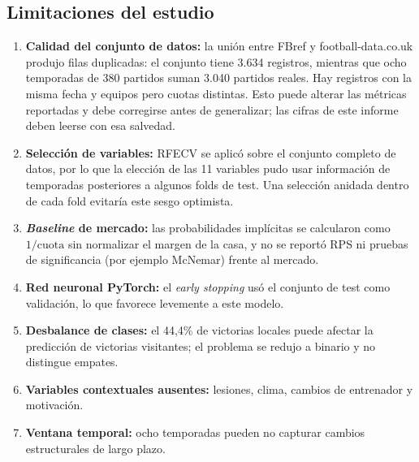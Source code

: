 \documentclass{ieeeaccess}
\begin{document}
\subsection{Limitaciones del estudio}
\begin{enumerate}
\item \textbf{Calidad del conjunto de datos:} la unión entre FBref y football-data.co.uk produjo filas duplicadas: el conjunto tiene 3.634 registros, mientras que ocho temporadas de 380 partidos suman 3.040 partidos reales. Hay registros con la misma fecha y equipos pero cuotas distintas. Esto puede alterar las métricas reportadas y debe corregirse antes de generalizar; las cifras de este informe deben leerse con esa salvedad.
\item \textbf{Selección de variables:} RFECV se aplicó sobre el conjunto completo de datos, por lo que la elección de las 11 variables pudo usar información de temporadas posteriores a algunos folds de test. Una selección anidada dentro de cada fold evitaría este sesgo optimista.
\item \textbf{\textit{Baseline} de mercado:} las probabilidades implícitas se calcularon como $1/\text{cuota}$ sin normalizar el margen de la casa, y no se reportó RPS ni pruebas de significancia (por ejemplo McNemar) frente al mercado.
\item \textbf{Red neuronal PyTorch:} el \textit{early stopping} usó el conjunto de test como validación, lo que favorece levemente a este modelo.
\item \textbf{Desbalance de clases:} el 44,4\% de victorias locales puede afectar la predicción de victorias visitantes; el problema se redujo a binario y no distingue empates.
\item \textbf{Variables contextuales ausentes:} lesiones, clima, cambios de entrenador y motivación.
\item \textbf{Ventana temporal:} ocho temporadas pueden no capturar cambios estructurales de largo plazo.
\end{enumerate}
\end{document}
